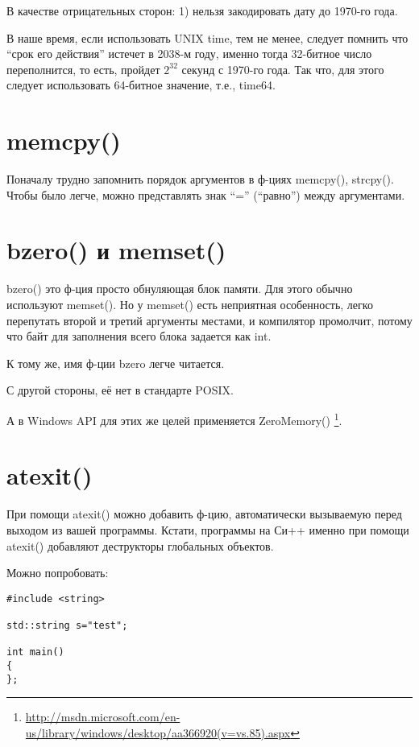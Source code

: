 В качестве отрицательных сторон: 1) нельзя закодировать дату до 1970-го года.

В наше время, если использовать UNIX time, тем не менее, следует помнить что ``срок его действия'' истечет
в 2038-м году, именно тогда 32-битное число переполнится, то есть, пройдет $2^{32}$ секунд с 1970-го года.
Так что, для этого следует использовать 64-битное значение, т.е., time64.


\label{memcpy}
\section{memcpy()}

Поначалу трудно запомнить порядок аргументов в ф-циях memcpy(), strcpy(). Чтобы было легче, можно представлять
знак ``='' (``равно'') между аргументами.

\label{bzero}
\section{bzero() и memset()}

bzero() это ф-ция просто обнуляющая блок памяти.
Для этого обычно используют memset(). Но у memset() есть неприятная особенность, легко перепутать второй
и третий аргументы местами, и компилятор промолчит, потому что байт для заполнения всего блока задается как int.

К тому же, имя ф-ции bzero легче читается.

С другой стороны, её нет в стандарте POSIX.

А в Windows API для этих же целей применяется ZeroMemory()
\footnote{\url{http://msdn.microsoft.com/en-us/library/windows/desktop/aa366920(v=vs.85).aspx}}.



\section{atexit()}

При помощи atexit() можно добавить ф-цию, автоматически вызываемую перед выходом из вашей программы.
Кстати, программы на Си++ именно при помощи atexit() добавляют деструкторы глобальных объектов.

Можно попробовать:

\begin{lstlisting}
#include <string>

std::string s="test";

int main()
{
};
\end{lstlisting}


